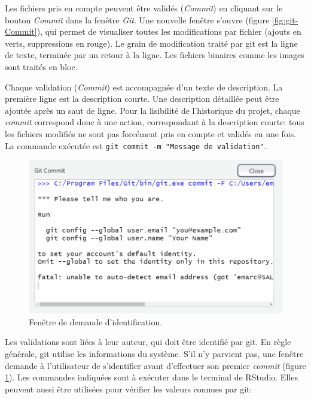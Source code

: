 \documentclass[
  12pt,
  french,
  a4paper,
  extrafontsizes,onecolumn,openright
  ]{memoir}
\begin{document}
\normalsize

Les fichiers pris en compte peuvent être validés (\emph{Commit}) en cliquant sur le bouton \emph{Commit} dans la fenêtre \emph{Git}.
Une nouvelle fenêtre s'ouvre (figure \ref{fig:git-Commit}), qui permet de visualiser toutes les modifications par fichier (ajouts en verts, suppressions en rouge).
Le grain de modification traité par git est la ligne de texte, terminée par un retour à la ligne.
Les fichiers binaires comme les images sont traités en bloc.

Chaque validation (\emph{Commit}) est accompagnée d'un texte de description.
La première ligne est la description courte.
Une description détaillée peut être ajoutée après un saut de ligne.
Pour la lisibilité de l'historique du projet, chaque \emph{commit} correspond donc à une action, correspondant à la description courte: tous les fichiers modifiés ne sont pas forcément pris en compte et validés en une fois.
La commande exécutée est \texttt{git\ commit\ -m\ "Message\ de\ validation"}.



\scriptsize

\begin{figure}

{\centering \includegraphics[width=0.8\linewidth]{images/git-id} 

}

\caption{Fenêtre de demande d'identification.}\label{fig:git-id}
\end{figure}

\normalsize

Les validations sont liées à leur auteur, qui doit être identifié par git.
En règle générale, git utilise les informations du système.
S'il n'y parvient pas, une fenêtre demande à l'utilisateur de s'identifier avant d'effectuer son premier \emph{commit} (figure \ref{fig:git-id}).
Les commandes indiquées sont à exécuter dans le terminal de RStudio.
Elles peuvent aussi être utilisées pour vérifier les valeurs connues par git:
\end{document}
